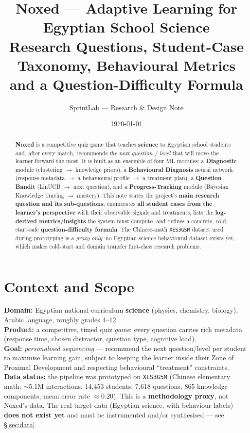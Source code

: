 \documentclass[11pt]{article}
\title{\vspace{-1.2cm}\textbf{\color{nblue}Noxed --- Adaptive Learning for Egyptian School Science}\\[2pt]
\large Research Questions, Student-Case Taxonomy, Behavioural Metrics\\ and a Question-Difficulty Formula}
\author{\normalsize SprintLab --- Research \& Design Note}
\date{\normalsize \today}
\begin{document}
\maketitle
\vspace{-0.6cm}

\begin{abstract}\noindent
\textbf{Noxed} is a competitive quiz game that teaches \textbf{science} to Egyptian school students and, after every match, recommends \emph{the next question / level} that will move the learner forward the most. It is built as an ensemble of four ML modules: a \textbf{Diagnostic} module (clustering $\rightarrow$ knowledge priors), a \textbf{Behavioural Diagnosis} neural network (response metadata $\rightarrow$ a behavioural profile $\rightarrow$ a treatment plan), a \textbf{Question Bandit} (LinUCB $\rightarrow$ next question), and a \textbf{Progress-Tracking} module (Bayesian Knowledge Tracing $\rightarrow$ mastery). This note states the project's \textbf{main research question and its sub-questions}, enumerates \textbf{all student cases from the learner's perspective} with their observable signals and treatments, lists the \textbf{log-derived metrics/insights} the system must compute, and defines a concrete, cold-start-safe \textbf{question-difficulty formula}. The Chinese-math \texttt{XES3G5M} dataset used during prototyping is a \emph{proxy only}: no Egyptian-science behavioural dataset exists yet, which makes cold-start and domain transfer first-class research problems.
\end{abstract}

\section{Context and Scope}
\textbf{Domain:} Egyptian national-curriculum \textbf{science} (physics, chemistry, biology), Arabic language, roughly grades 4--12.\\
\textbf{Product:} a competitive, timed quiz \emph{game}; every question carries rich metadata (response time, chosen distractor, question type, cognitive load).\\
\textbf{Goal:} \emph{personalised sequencing} --- recommend the next question/level per student to maximise learning gain, subject to keeping the learner inside their Zone of Proximal Development and respecting behavioural ``treatment'' constraints.\\
\textbf{Data status:} the pipeline was prototyped on \texttt{XES3G5M} (Chinese elementary math: $\sim$5.1M interactions, 14{,}453 students, 7{,}618 questions, 865 knowledge components, mean error rate $\approx0.20$). This is a \textbf{methodology proxy}, not Noxed's data. The real target data (Egyptian science, with behaviour labels) \textbf{does not exist yet} and must be instrumented and/or synthesised --- see \S\ref{sec:data}.
\end{document}
